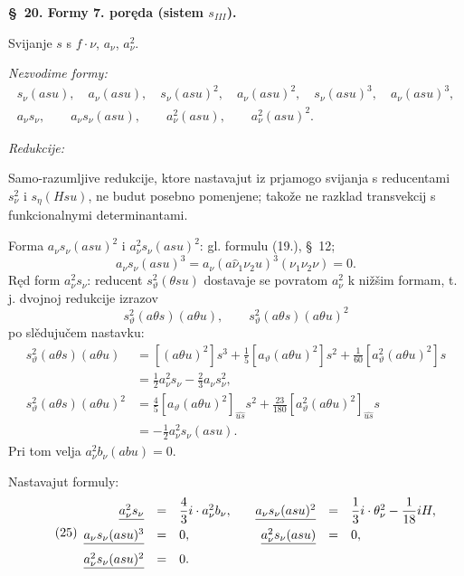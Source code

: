 \documentclass[11pt]{article}
\begin{document}
\begin{center}
\textbf{\S\ 20. \quad Formy 7. poręda (sistem $s_{III}$).}
\end{center}

Svijanje $s$ s $f\cdot \nu$, $a_{\nu}$, $a_{\nu}^2$.

\noindent\textit{Nezvodime formy:}
\[
\begin{gathered}
s_{\nu}(asu),\quad a_{\nu}(asu),\quad s_{\nu}(asu)^2,\quad a_{\nu}(asu)^2,\quad
s_{\nu}(asu)^3,\quad a_{\nu}(asu)^3,\\
a_{\nu} s_{\nu},\qquad a_{\nu} s_{\nu}(asu),\qquad a_{\nu}^2(asu),\qquad a_{\nu}^2(asu)^2.
\end{gathered}
\]

\noindent\textit{Redukcije:}

Samo-razumljive redukcije, ktore nastavajut iz prjamogo svijanja s reducentami $s_{\nu}^2$ i $s_\eta(Hsu)$, ne budut posebno pomenjene; takože ne razklad transvekcij s funkcionalnymi determinantami.

Forma $a_{\nu}s_{\nu}(asu)^2$ i $a_{\nu}^2s_{\nu}(asu)^2$: gl. formulu (19.), \S\ 12;
\[
a_{\nu}s_{\nu}(asu)^3=a_{\nu}(a\widehat{\nu}_1\nu_2u)^3(\nu_1\nu_2\nu)=0.
\]
Ręd form $a_{\nu}^2s_{\nu}$: reducent $s_\vartheta^2(\theta su)$ dostavaje se povratom $a_{\nu}^2$ k nižšim formam, t. j. dvojnoj redukcije izrazov
\[
s_\vartheta^2(a\theta s)(a\theta u),\qquad
s_\vartheta^2(a\theta s)(a\theta u)^2
\]
po slědujučem nastavku:
\[
\begin{aligned}
s_\vartheta^2(a\theta s)(a\theta u)
&=[(a\theta u)^2]s^3+\frac15[a_\vartheta(a\theta u)^2]s^2+\frac1{60}[a_\vartheta^2(a\theta u)^2]s\\
&=\frac12a_{\nu}^2s_{\nu}-\frac23a_{\nu}s_{\nu}^2,\\
s_\vartheta^2(a\theta s)(a\theta u)^2
&=\frac45[a_\vartheta(a\theta u)^2]_{\widehat{us}}s^2+\frac{23}{180}[a_\vartheta^2(a\theta u)^2]_{\widehat{us}}s\\
&=-\frac12a_{\nu}^2s_{\nu}(asu).
\end{aligned}
\]
Pri tom velja $a_{\nu}^2b_{\nu}(abu)=0$.

Nastavajut formuly:
\[
\tag{25}
\begin{array}{rcl@{\qquad}rcl}
\underline{a_{\nu}^2s_{\nu}}&=&\dfrac43i\cdot a_{\nu}^2b_{\nu},
& \underline{a_{\nu}s_{\nu}(asu)^2}&=&\dfrac13i\cdot\theta_{\nu}^2-\dfrac1{18}iH,\\[0.7em]
\underline{a_{\nu}s_{\nu}(asu)^3}&=&0,
& \underline{a_{\nu}^2s_{\nu}(asu)}&=&0,\\[0.7em]
\underline{a_{\nu}^2s_{\nu}(asu)^2}&=&0.
\end{array}
\]
\end{document}
